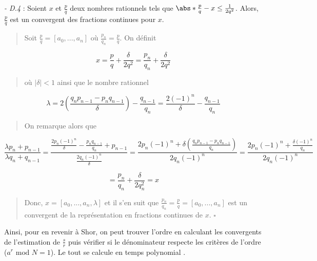 \textit{- D.4} : Soient $x$ et $\frac{p}{q}$ deux nombres rationnels tels que $\abs*{\frac{p}{q} - x} \leq \frac{1}{2q^2}$. Alors, $\frac{p}{q}$ est un convergent des fractions continues pour $x$.

\begin{quote}
    Soit $\frac{p}{q} = [a_0, ..., a_n]$ où $\frac{p_n}{q_n} = \frac{p}{q}$. On définit 
\end{quote}

\begin{equation*}
    x = \frac{p}{q} + \frac{\delta}{2q^2} = \frac{p_n}{q_n} + \frac{\delta}{2q^2}
\end{equation*}

\begin{quote}
    où $|\delta| < 1$ ainsi que le nombre rationnel
\end{quote}

\begin{equation*}
    \lambda = 2 \left(\frac{q_np_{n-1} - p_nq_{n-1}}{\delta}\right) - \frac{q_{n-1}}{q_n} = \frac{2(-1)^n}{\delta} - \frac{q_{n-1}}{q_n} 
\end{equation*}

\begin{quote}
    On remarque alors que
\end{quote}

\begin{equation*}
    \frac{\lambda p_n + p_{n-1}}{\lambda q_n + q_{n-1}} = \frac{\frac{2p_n(-1)^n}{\delta} - \frac{p_nq_{n-1}}{q_n}  + p_{n-1}}{\frac{2q_n(-1)^n}{\delta}} = \frac{2p_n(-1)^n + \delta\left(\frac{q_np_{n-1} -p_nq_{n-1}}{q_n}\right)}{2q_n(-1)^n} = \frac{2p_n(-1)^n + \frac{\delta(-1)^n}{q_n}}{2q_n(-1)^n}
\end{equation*}

\begin{equation*}
    = \frac{p_n}{q_n} + \frac{\delta}{2q_n^2} = x
\end{equation*}

\begin{quote}
    Donc, $x = [a_0, ..., a_n, \lambda]$ et il s'en suit que $\frac{p_n}{q_n} = \frac{p}{q} = [a_0, ..., a_n]$ est un convergent de la représentation en fractions continues de $x$. $\square$
\end{quote}

Ainsi, pour en revenir à Shor, on peut trouver l'ordre en calculant les convergents de l'estimation de $\frac{s}{r}$ puis vérifier si le dénominateur respecte les critères de l'ordre ($a^r \text{ mod } N = 1$). Le tout se calcule en temps polynomial \cite{nielsen00}.